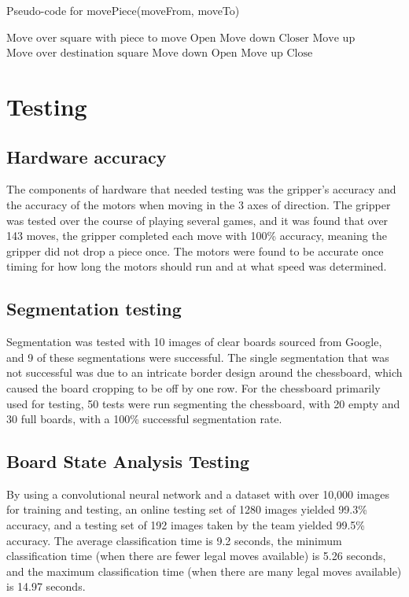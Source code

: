 \documentclass[onecolumn]{IEEEtran}
\begin{document}
\begin{algorithm}[H]
\caption{Pseudo-code for movePiece(moveFrom, moveTo)}
\begin{algorithmic}[1]
\STATE $\text{Move over square with piece to move}$
\STATE $\text{Open}$
\STATE $\text{Move down}$
\STATE $\text{Closer}$
\STATE $\text{Move up}$
\STATE $\text{Move over destination square}$
\STATE $\text{Move down}$
\STATE $\text{Open}$
\STATE $\text{Move up}$
\STATE $\text{Close}$
\end{algorithmic}
\end{algorithm}


\section{Testing}
\subsection{Hardware accuracy}
The components of hardware that needed testing was the gripper's accuracy and the accuracy of the motors when moving in the 3 axes of direction. The gripper was tested over the course of playing several games, and it was found that over 143 moves, the gripper completed each move with 100\% accuracy, meaning the gripper did not drop a piece once. The motors were found to be accurate once timing for how long the motors should run and at what speed was determined. 
\subsection{Segmentation testing}
Segmentation was tested with 10 images of clear boards sourced from Google, and 9 of these segmentations were successful. The single segmentation that was not successful was due to an intricate border design around the chessboard, which caused the board cropping to be off by one row. For the chessboard primarily used for testing, 50 tests were run segmenting the chessboard, with 20 empty and 30 full boards, with a 100\% successful segmentation rate. 
\subsection{Board State Analysis Testing}
By using a convolutional neural network and a dataset with over 10,000 images for training and testing, an online testing set of 1280 images yielded 99.3\% accuracy, and a testing set of 192 images taken by the team yielded 99.5\% accuracy. The average classification time is 9.2 seconds, the minimum classification time (when there are fewer legal moves available) is 5.26 seconds, and the maximum classification time (when there are many legal moves available) is 14.97 seconds.
\end{document}
